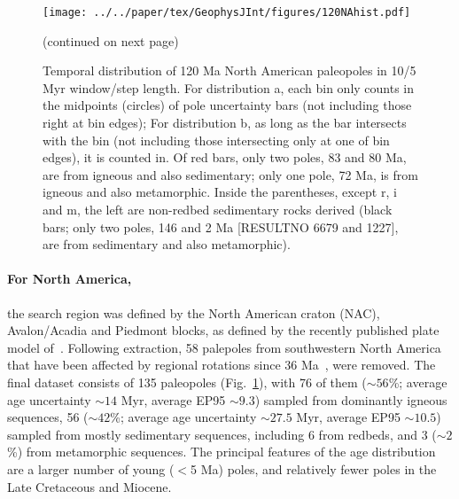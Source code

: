 \begin{figure}[tbp]
  \captionsetup{singlelinecheck=false,justification=raggedright}
  \centering
  \texttt{[image: ../../paper/tex/GeophysJInt/figures/120NAhist.pdf]}
  \caption[Distribution of 120 Ma North American paleopoles]{(continued on next page)}
\end{figure}
\begin{figure}[!ht]
  \ContinuedFloat\caption[(continued) Distribution of 120 Ma North American
    paleopoles]{Temporal distribution of 120 Ma North American
    paleopoles in 10/5 Myr window/step length. For distribution a, each bin only
    counts in the midpoints (circles) of pole uncertainty bars (not including
    those right at bin edges); For distribution b, as long as the bar intersects
    with the bin (not including those intersecting only at one of bin edges), it
    is counted in. Of red bars, only two poles, 83 and
    80 Ma, are from igneous and also sedimentary; only one pole,
    72 Ma, is from igneous and also metamorphic. Inside the
    parentheses, except r, i and m, the left are non-redbed sedimentary rocks
    derived (black bars; only two poles, 146 and 2 Ma
    [RESULTNO 6679 and 1227], are from sedimentary and also
    metamorphic).}\label{fig-120NAhist}
\end{figure}

\paragraph{For North America,}
the search region was defined by the North American craton (NAC), Avalon/Acadia
and Piedmont blocks, as defined by the recently published plate model
of~\citet{Y18}. Following extraction, 58 palepoles from southwestern North
America that have been affected by regional rotations since 36 Ma~\citep{Mc06},
were removed. The final dataset consists of 135 paleopoles
(Fig.~\ref{fig-120NAhist}), with 76 of them (${\sim}56$\%; average age
uncertainty ${\sim}14$ Myr, average EP95 ${\sim}9.3$\degree) sampled from
dominantly igneous sequences, 56 (${\sim}42$\%; average age uncertainty
${\sim}27.5$ Myr, average EP95 ${\sim}10.5$\degree) sampled from mostly
sedimentary sequences, including 6 from redbeds, and 3 (${\sim}2$\%) from
metamorphic sequences. The principal features of the age distribution are a
larger number of young ($<$5 Ma) poles, and relatively fewer poles in the Late
Cretaceous and Miocene.

